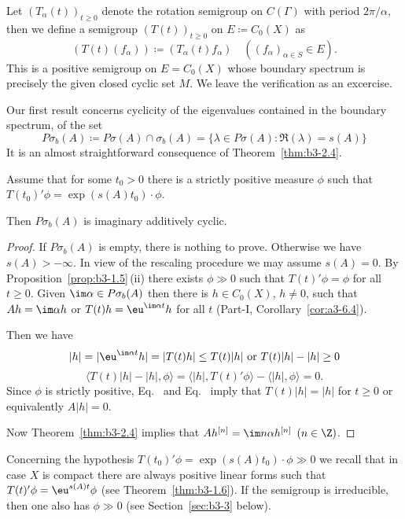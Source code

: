 \begin{examples}
\begin{enumerate}[\upshape (i), wide, labelindent=.25em]
	Let $(T_{\alpha}(t))_{t \geq 0}$ denote the rotation semigroup on $C(\Gamma)$ with period $2\pi/\alpha$, then we define a semigroup $(T(t))_{t \geq 0}$ on $E \coloneqq C_{0}(X)$ as
	\[
	(T(t)(f_{\alpha})) \coloneqq (T_{\alpha}(t)f_{\alpha}) \quad ((f_{\alpha})_{\alpha \in S} \in E).
	\]
	This is a positive semigroup on $E = C_{0}(X)$ whose boundary spectrum is precisely the given closed cyclic set $M$.
	We leave the verification as an excercise.
	
\end{enumerate}
\end{examples}
Our first result concerns cyclicity of the eigenvalues contained in the boundary spectrum, \ie of the set
	\[
	P\sigma_{b}(A) \coloneqq P\sigma(A) \cap \sigma_{b}(A) = \{\lambda \in P\sigma(A) \colon \Re(\lambda)  = s(A)\}
	\]
	It is an almost straightforward consequence of Theorem~\ref{thm:b3-2.4}.
	\begin{proposition}\label{prop:b3-2.7}
		
		Assume that for some $t_{0} > 0$ there is a strictly positive measure $\phi$ such that $T(t_{0})'\phi = \exp(s(A)t_{0})\cdot\phi$.
		
		Then $P\sigma_{b}(A)$ is imaginary additively cyclic.
	\end{proposition}
\begin{proof}
If\/ $P\sigma_{b}(A)$ is empty, there is nothing to prove.
Otherwise we have $s(A) > -\infty$.
In view of the rescaling procedure we may assume $s(A) = 0$.
By Proposition~\ref{prop:b3-1.5}\,(ii) there exists $\phi \gg 0$ such that $T(t)'\phi = \phi$ for all $t \geq 0$.
Given $\im \alpha \in P\sigma_{b}(A)$ then there is $h \in C_{0}(X)$, $h \neq 0$, such that $Ah = \im\alpha h$ or $T(t)h = \eu^{\im\alpha t}h$ for all $t$ (Part-I, Corollary~\ref{cor:a3-6.4}).

	Then we have
	\begin{equation}\label{eq:b3-2.14}
		|h| = |\eu^{\im\alpha t}h| = |T(t)h| \leq T(t)|h| \text{ or } T(t)|h| - |h| \geq 0
	\end{equation}
	\begin{equation}\label{eq:b3-2.15}
		\langle T(t)|h| - |h|,\phi \rangle = \langle |h|,T(t)'\phi \rangle - \langle |h|,\phi \rangle = 0.
	\end{equation}
	Since $\phi$ is strictly positive, Eq.~  and Eq.~ imply that $T(t)|h| = |h|$ for $t \geq 0$ or equivalently $A|h| = 0$.
	
	Now Theorem~\ref{thm:b3-2.4} implies that $Ah^{[n]} = \im n\alpha h^{[n]}$ $(n \in \Z)$.
\end{proof}
Concerning the hypothesis $T(t_{0})'\phi = \exp(s(A)t_{0})\cdot\phi \gg 0$ we recall that in case $X$ is compact there are always positive linear forms such that $T(t)'\phi = \eu^{s(A)t}\phi$ (see Theorem~\ref{thm:b3-1.6}).
If the semigroup is irreducible, then one also has $\phi \gg 0$ (see Section~\ref{sec:b3-3} below).

